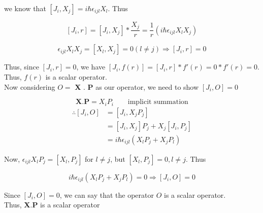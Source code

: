 we know that $\left[ J_{i}, X_{j}\right] = i\hbar\epsilon_{ijl}X_{l}$. Thus

\begin{equation*}
    \left[ J_{i},r \right] = \left[ J_{i},X_{j} \right]*\frac{X_{j}}{r} = \frac{1}{r}\left(i\hbar\epsilon_{ijl}X_{l}X_{j}\right)
\end{equation*}

\begin{equation*}
    \epsilon_{ijl}X_{l}X_{j} = \left[ X_{l},X_{j}\right] = 0 (l \neq j) \Rightarrow \left[ J_{i},r \right] = 0
\end{equation*}

Thus, since $\left[ J_{i},r \right] = 0$, we have $\left[ J_{i},f(r) \right] = \left[ J_{i},r \right]*f'(r) = 0*f'(r) = 0$.\\
Thus, $f(r)$ is a scalar operator.\\

Now considering $O =$ \textbf{X} . \textbf{P} as our operator, we need to show $ \left[ J_{i},O \right] = 0 $

\begin{equation*}
    \mathbf{X}.\mathbf{P} = X_{i}P_{i} \qquad {\text{implicit summation}}
\end{equation*}
    \begin{equation*}
    \begin{split}
        \therefore \left[ J_{i},O \right] & = \left[ J_{i}, X_{j}P_{j} \right] \\
        & = \left[ J_{i}, X_{j} \right]P_{j} + X_{j}\left[ J_{i}, P_{j} \right] \\
        & = i\hbar\epsilon_{ijl}(X_{l}P_{j} + X_{j}P_{l})
    \end{split}
\end{equation*}

Now, $\epsilon_{ijl}X_{l}P_{j} = [X_{l}, P_{j}]$ for $l \neq j$, but $[X_{l}, P_{j}] = 0, l \neq j$. Thus

\begin{equation*}
        i\hbar\epsilon_{ijl}(X_{l}P_{j} + X_{j}P_{l}) = 0 \Rightarrow [J_{i}, O] = 0
\end{equation*}

Since $[J_{i}, O] = 0$, we can say that the operator $O$ is a scalar operator.\\
Thus, \textbf{X}.\textbf{P} is a scalar operator
